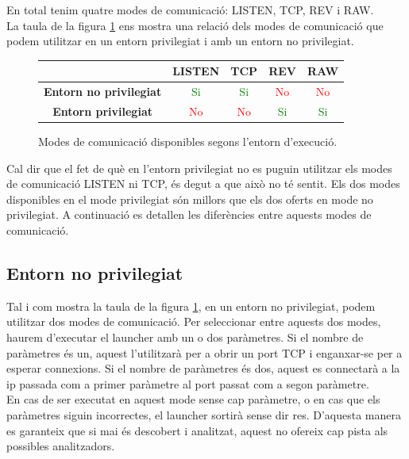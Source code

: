En total tenim quatre modes de comunicació: LISTEN, TCP, REV i RAW. \\

La taula de la figura  \ref{fig:tableModesRelation} ens mostra una relació dels modes de comunicació que podem utilitzar
en un entorn privilegiat i amb un entorn no privilegiat.

\begin{figure}[htp]
    \centering
    \begin{tabular}{|c|c|c|c|c|}
        \hline
         & \textbf{LISTEN} & \textbf{TCP} & \textbf{REV} & \textbf{RAW} \\ \hline
         \textbf{Entorn no privilegiat} & \textcolor{Green}{Si} & \textcolor{Green}{Si} & \textcolor{Red}{No} & \textcolor{Red}{No} \\ \hline
         \textbf{Entorn privilegiat} & \textcolor{Red}{No} & \textcolor{Red}{No} & \textcolor{Green}{Si} & \textcolor{Green}{Si} \\ \hline
    \end{tabular}
    \caption{Modes de comunicació disponibles segons l'entorn d'execució.}
    \label{fig:tableModesRelation}
\end{figure}


Cal dir que el fet de què en l'entorn privilegiat no es puguin utilitzar els modes de comunicació LISTEN ni TCP, és degut
a que això no té sentit. Els dos modes disponibles en el mode privilegiat són millors que els dos oferts en mode no
privilegiat. A continuació es detallen les diferències entre aquests modes de comunicació.

\subsection{Entorn no privilegiat}

Tal i com mostra la taula de la figura \ref{fig:tableModesRelation}, en un entorn no privilegiat, podem utilitzar dos modes de
comunicació. Per seleccionar entre aquests dos modes, haurem d'executar el launcher amb un o dos paràmetres. Si el nombre de
paràmetres és un, aquest l'utilitzarà per a obrir un port TCP i enganxar-se per a esperar connexions. Si el nombre de paràmetres
és dos, aquest es connectarà a la ip passada com a primer paràmetre al port passat com a segon paràmetre. \\

En cas de ser executat en aquest mode sense cap paràmetre, o en cas que els paràmetres siguin incorrectes, el launcher sortirà
sense dir res. D'aquesta manera es garanteix que si mai és descobert i analitzat, aquest no ofereix cap pista als possibles analitzadors. \\

